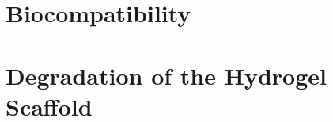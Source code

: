 \documentclass[
    letterpaper,
    10pt,
    unnumberedsections,
    twoside
]{LTJournalArticle}
\begin{document}
    \section{Biocompatibility}

    

    \section{Degradation of the Hydrogel Scaffold}

    


    

    \onecolumn
    \printbibliography
\end{document}
